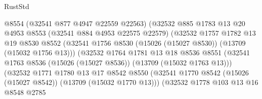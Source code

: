 \begin{lexlean}{RustStd}
\begin{coremodule}
                                  @8554
                                  (@32541 @877 @4947 @22559 @22563)
                                  (@32532
                                    @885
                                    @1783
                                    @13
                                    @20
                                    @4953
                                    @8553
                                    (@32541 @884 @4953 @22575 @22579)
                                    (@32532
                                      @1757
                                      @1782
                                      @13
                                      @19
                                      @8530
                                      @8552
                                      (@32541
                                        @1756
                                        @8530
                                        (@15026 (@15027 @8530))
                                        (@13709 (@15032 @1756 @13)))
                                      (@32532
                                        @1764
                                        @1781
                                        @13
                                        @18
                                        @8536
                                        @8551
                                        (@32541
                                          @1763
                                          @8536
                                          (@15026 (@15027 @8536))
                                          (@13709 (@15032 @1763 @13)))
                                        (@32532
                                          @1771
                                          @1780
                                          @13
                                          @17
                                          @8542
                                          @8550
                                          (@32541
                                            @1770
                                            @8542
                                            (@15026 (@15027 @8542))
                                            (@13709 (@15032 @1770 @13)))
                                          (@32532
                                            @1778
                                            @103
                                            @13
                                            @16
                                            @8548
                                            @2785

\end{coremodule}
\end{lexlean}
